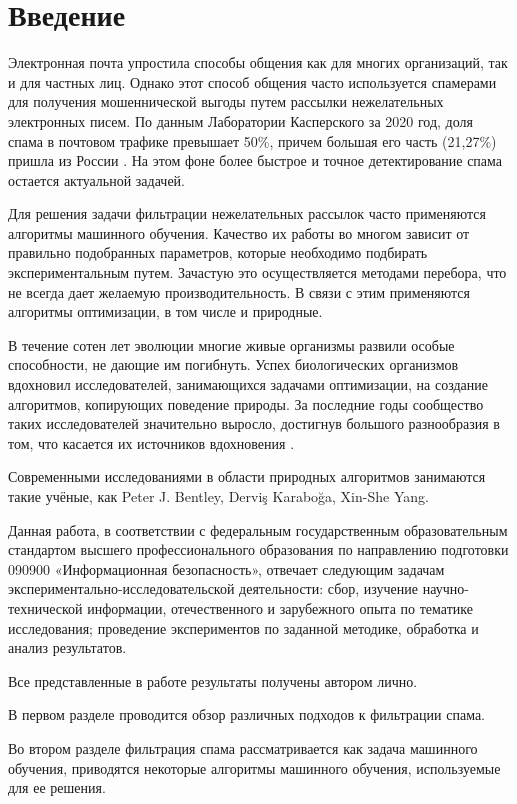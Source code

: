 \chapter*{Введение}

Электронная почта упростила способы общения как для многих организаций, так и для
частных лиц. Однако этот способ общения часто используется спамерами для получения
мошеннической выгоды путем рассылки нежелательных электронных писем. \cite{IEEE}
По данным Лаборатории Касперского за 2020 год, доля спама в почтовом трафике превышает
50\%, причем большая его часть (21,27\%) пришла из России \cite{stat}. На этом фоне
более быстрое и точное детектирование спама остается актуальной задачей.

Для решения задачи фильтрации нежелательных рассылок часто применяются
алгоритмы машинного обучения. Качество их работы во многом зависит от правильно
подобранных параметров, которые необходимо подбирать экспериментальным путем.
Зачастую это осуществляется методами перебора, что не всегда дает желаемую
производительность. В связи с этим применяются алгоритмы оптимизации, в том числе
и природные.

В течение сотен лет эволюции многие живые организмы развили особые способности,
не дающие им погибнуть. Успех биологических организмов вдохновил исследователей,
занимающихся задачами оптимизации, на создание алгоритмов,
копирующих поведение природы. За последние годы сообщество таких исследователей
значительно выросло, достигнув большого разнообразия в том, что касается их
источников вдохновения \cite{BioInspiredTaxonomy}.

Современными исследованиями в области природных алгоритмов занимаются такие учёные, как Peter J. Bentley,
Derviş Karaboğa, Xin-She Yang.

Данная работа, в соответствии с федеральным государственным образовательным стандартом высшего профессионального
образования по направлению подготовки 090900 «Информационная безопасность», отвечает следующим задачам
экспериментально-исследовательской деятельности: сбор, изучение научно-технической информации, отечественного и
зарубежного опыта по тематике исследования; проведение экспериментов по заданной методике, обработка и анализ результатов.

Все представленные в работе результаты получены автором лично.

В первом разделе проводится обзор различных подходов к фильтрации спама.

Во втором разделе фильтрация спама рассматривается как задача машинного обучения,
приводятся некоторые алгоритмы машинного обучения, используемые для ее решения.

